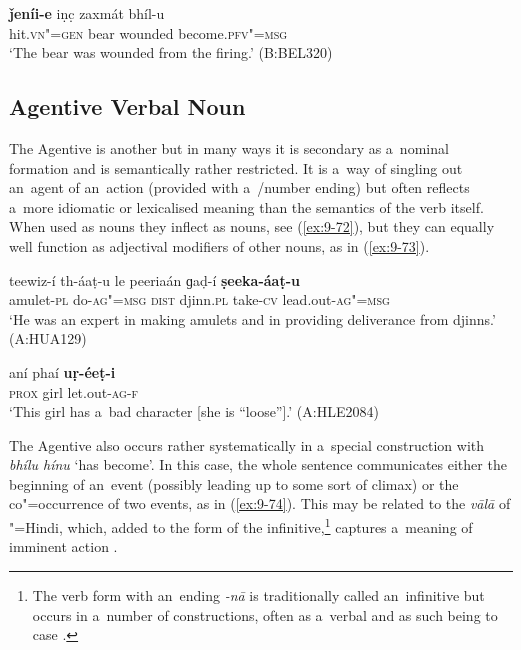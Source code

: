 \begin{exe}
\ex
\label{ex:9-71}
\gll \textbf{ǰeníi-e} iṇc̣ zaxmát bhíl-u \\
hit.\textsc{vn"=gen} bear wounded become.\textsc{pfv"=msg} \\
\glt `The bear was wounded from the firing.' (B:BEL320)
\end{exe}

\subsection{Agentive Verbal Noun}
\label{subsec:9-3-4}


The Agentive  is another  but in many ways it is secondary as a~nominal formation and is semantically rather restricted. It is a~way of singling out an~agent of an~action (provided with a~/number ending) but often reflects a~more idiomatic or lexicalised meaning than the semantics of the verb itself. When used as nouns they inflect as nouns, see (\ref{ex:9-72}), but they can equally well function as adjectival modifiers of other nouns, as in (\ref{ex:9-73}).

\begin{exe}
\ex
\label{ex:9-72}
\gll teewiz-í th-áaṭ-u le peeriaán ɡaḍ-í \textbf{ṣeeka-áaṭ-u} \\
amulet-\textsc{pl} do-\textsc{ag"=msg} \textsc{dist} djinn.\textsc{pl} take-\textsc{cv} lead.out-\textsc{ag"=msg} \\
\glt `He was an expert in making amulets and in providing deliverance from djinns.' (A:HUA129)

\ex
\label{ex:9-73}
\gll aní phaí \textbf{uṛ-éeṭ-i} \\
\textsc{prox} girl let.out-\textsc{ag-f} \\
\glt `This girl has a~bad character [she is ``loose''].' (A:HLE2084)
\end{exe}

The Agentive  also occurs rather systematically in a~special construction with \textit{bhílu hínu} `has become'. In this case, the whole sentence communicates either the beginning of an~event (possibly leading up to some sort of climax) or the co"=occurrence of two events, as in (\ref{ex:9-74}). This may be related to the \textit{vālā} of \iliUrdu"=Hindi, which, added to the  form of the infinitive,\footnote{The \iliUrdu verb form with an~ending \textit{-nā} is traditionally called an~infinitive but occurs in a~number of constructions, often as a~verbal  and as such being  to case  \citep[132--142]{schmidt1999}.} captures a~meaning of imminent action \citep[139]{schmidt1999}. 


